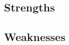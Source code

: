 \documentclass[paper.tex]{subfiles}
\begin{document}
	\subsection{Strengths}
	
	
	\subsection{Weaknesses}
	
\end{document}
